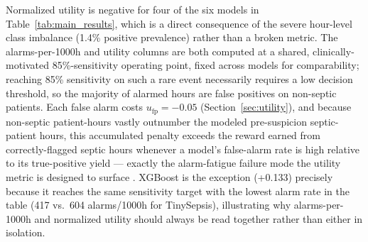 \documentclass[11pt]{article}
\begin{document}
Normalized utility is negative for four of the six models in Table~\ref{tab:main_results}, which is a direct consequence of the severe hour-level class imbalance (1.4\% positive prevalence) rather than a broken metric. The alarms-per-1000h and utility columns are both computed at a shared, clinically-motivated 85\%-sensitivity operating point, fixed across models for comparability; reaching 85\% sensitivity on such a rare event necessarily requires a low decision threshold, so the majority of alarmed hours are false positives on non-septic patients. Each false alarm costs $u_{\text{fp}}=-0.05$ (Section~\ref{sec:utility}), and because non-septic patient-hours vastly outnumber the modeled pre-suspicion septic-patient hours, this accumulated penalty exceeds the reward earned from correctly-flagged septic hours whenever a model's false-alarm rate is high relative to its true-positive yield --- exactly the alarm-fatigue failure mode the utility metric is designed to surface \citep{sendak2020real}. XGBoost is the exception (+0.133) precisely because it reaches the same sensitivity target with the lowest alarm rate in the table (417 vs.\ 604 alarms/1000h for TinySepsis), illustrating why alarms-per-1000h and normalized utility should always be read together rather than either in isolation.
\end{document}
